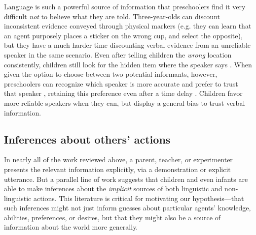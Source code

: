 \documentclass[man]{apa2}
\begin{document}
Language is such a powerful source of information that preschoolers find it very difficult \emph{not} to believe what they are told.  Three-year-olds can discount inconsistent evidence conveyed through physical markers (e.g. they can learn that an agent purposely places a sticker on the wrong cup, and select the opposite), but they have a much harder time discounting verbal evidence from an unreliable speaker in the same scenario. Even after telling children the \emph{wrong} location consistently, children still look for the hidden item where the speaker says \cite{jaswal2010}.  When given the option to choose between two potential informants, however, preschoolers can recognize which speaker is more accurate and prefer to trust that speaker \cite{pasquini2007}, retaining this preference even after a time delay \cite{corriveau2009}.  Children favor more reliable speakers when they can, but display a general bias to trust verbal information.


\subsection{Inferences about others' actions}


In nearly all of the work reviewed above, a parent, teacher, or experimenter presents the relevant information explicitly, via a demonstration or explicit utterance. But a parallel line of work suggests that children and even infants are able to make inferences about the \emph{implicit} sources of both linguistic and non-linguistic actions. This literature is critical for motivating our hypothesis---that such inferences might not just inform guesses about particular agents' knowledge, abilities, preferences, or desires, but that they might also be a source of information about the world more generally. 

\end{document}
